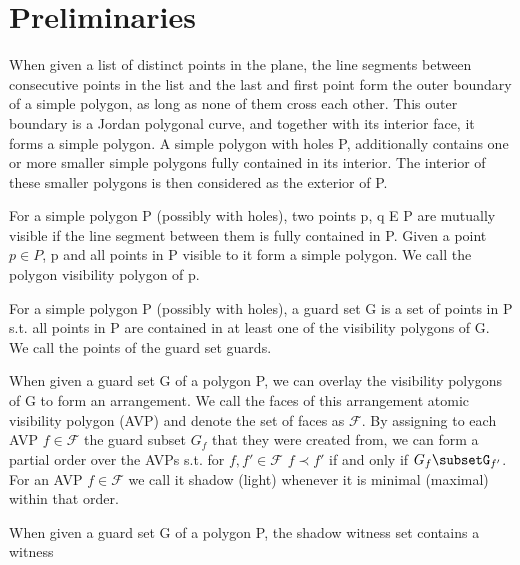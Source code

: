 \chapter{Preliminaries}
\begin{definition}
When given a list of distinct points in the plane, the line segments between consecutive points in the list and the last and first point form the outer boundary of a simple polygon, as long as none of them cross each other. This outer boundary is a Jordan polygonal curve, and together with its interior face, it forms a simple polygon. A simple polygon with holes P, additionally contains one or more smaller simple polygons fully contained in its interior. The interior of these smaller polygons is then considered as the exterior of P.
\end{definition}

\begin{definition}
For a simple polygon P (possibly with holes), two points p, q E P are mutually visible if the line segment between them is fully contained in P. Given a point $p\in P$, p and all points in P visible to it form a simple polygon. We call the polygon visibility polygon of p.
\end{definition}

\begin{definition}
For a simple polygon P (possibly with holes), a guard set G is a set of points in P s.t. all points in P are contained in at least one of the visibility polygons of G. We call the points of the guard set guards.
\end{definition}

\begin{definition}
When given a guard set G of a polygon P, we can overlay the visibility polygons of G to form an arrangement. We call the faces of this arrangement atomic visibility polygon (AVP) and denote the set of faces as $\mathcal{F}$. By assigning to each AVP $f\in\mathcal{F}$ the guard subset $G_{f}$ that they were created from, we can form a partial order over the AVPs s.t. for $f,f'\in\mathcal{F}$ $f\prec f'$ if and only if $G_{f}\subsetG_{f'}$. For an AVP $f\in\mathcal{F}$ we call it shadow (light) whenever it is minimal (maximal) within that order.
\end{definition}

\begin{definition}
When given a guard set G of a polygon P, the shadow witness set contains a witness 
\end{definition}

\begin{definition}
    
\end{definition}

\begin{definition}
    
\end{definition}

\begin{definition}
    
\end{definition}

\begin{definition}
    
\end{definition}
